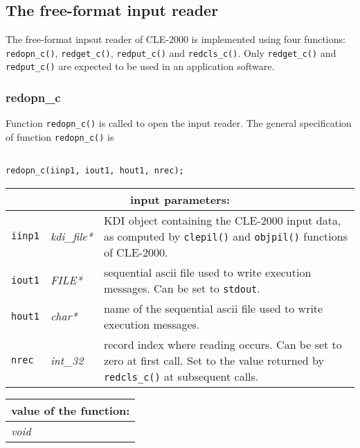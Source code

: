 \vskip 0.8cm

\subsection {The free-format input reader}

The free-format inpsut reader of CLE-2000 is implemented using four functions: {\tt redopn\_c()}, {\tt redget\_c()}, {\tt redput\_c()} and {\tt redcls\_c()}.
Only {\tt redget\_c()} and {\tt redput\_c()} are expected to be used in an application software.

\subsubsection{redopn\_c}

Function {\tt redopn\_c()} is called to open the input reader.
The general specification of function {\tt redopn\_c()} is

\begin{verbatim}

redopn_c(iinp1, iout1, hout1, nrec);
\end{verbatim}

\vskip 0.8cm

\noindent
\begin{tabular}{|p{1.5cm}|p{2cm}|p{11cm}|}
\hline
\multicolumn{3}{|c|}{\bf input parameters:} \\
\hline
{\tt iinp1} & {\it kdi\_file*} & KDI object containing the CLE-2000 input data, as computed  by {\tt clepil()} and {\tt objpil()} functions of CLE-2000.\\
\hline
{\tt iout1} & {\it FILE*} & sequential {\sc ascii} file used to write execution messages. Can be set to {\tt stdout}. \\
\hline
{\tt hout1} & {\it char*} & name of the sequential {\sc ascii} file used to write execution messages. \\
\hline
{\tt nrec} & {\it int\_32} & record index where reading occurs. Can be set to zero at first call. Set to the value returned by {\tt redcls\_c()} at subsequent calls.\\
\hline
\end{tabular}

\vskip 0.4cm

\noindent
\begin{tabular}{|p{4.0cm}|p{11cm}|}
\hline
\multicolumn{2}{|c|}{\bf value of the function:} \\
\hline
{\it void} &  \\
\hline
\end{tabular}

